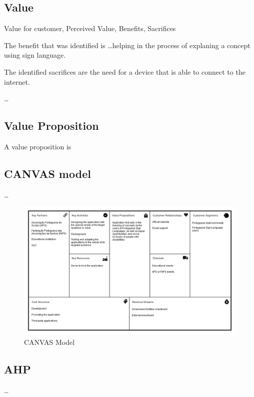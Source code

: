 \subsection{Value}

Value for customer, Perceived Value, Benefits, Sacrifices

The benefit that was identified is \dots helping in the process of explaning a concept using sign language.

The identified sacrifices are the need for a device that is able to connect to the internet.

\dots

\subsection{Value Proposition}

A value proposition is 

\subsection{CANVAS model}

\dots

\begin{figure}[H]
\centering
\includegraphics[width=\textwidth,keepaspectratio]{ch2/assets/CANVAS.png}
\caption[CANVAS]{CANVAS Model}
\label{fig:CANVAS}
\end{figure}

\subsection{AHP}

\dots

